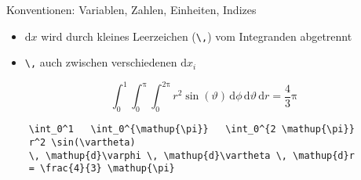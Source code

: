 \begin{frame}[fragile]{Konventionen: Variablen, Zahlen, Einheiten, Indizes}
  \begin{itemize}
    \item $\mathrm{d}x$ wird durch kleines Leerzeichen (\verb+\,+) vom Integranden abgetrennt
    \item \verb+\,+ auch zwischen verschiedenen $\mathup{d}x_i$
  \end{itemize}

  \begin{equation*}
    \int_0^1 \int_0^{\mathup{\pi}} \int_0^{2 \mathup{\pi}}
    r^2 \sin(\vartheta) \,
    \mathup{d}\phi \, \mathup{d}\vartheta \, \mathup{d}r
    = \frac{4}{3} \mathup{\pi}
  \end{equation*}

  \begin{lstlisting}
    \int_0^1   \int_0^{\mathup{\pi}}   \int_0^{2 \mathup{\pi}}
    r^2 \sin(\vartheta)
    \, \mathup{d}\varphi \, \mathup{d}\vartheta \, \mathup{d}r
    = \frac{4}{3} \mathup{\pi}
  \end{lstlisting}

\end{frame}
